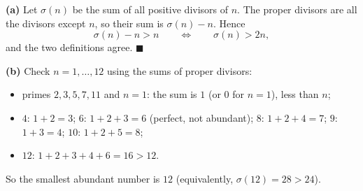 \textbf{(a)} Let $\sigma(n)$ be the sum of all positive divisors of $n$. The proper divisors are all the divisors except $n$, so their sum is $\sigma(n)-n$. Hence
\[
\sigma(n)-n>n\qquad\Longleftrightarrow\qquad \sigma(n)>2n ,
\]
and the two definitions agree. $\blacksquare$

\textbf{(b)} Check $n=1,\dots,12$ using the sums of proper divisors:
\begin{itemize}
\item primes $2,3,5,7,11$ and $n=1$: the sum is $1$ (or $0$ for $n=1$), less than $n$;
\item $4$: $1+2=3$; $6$: $1+2+3=6$ (perfect, not abundant); $8$: $1+2+4=7$; $9$: $1+3=4$; $10$: $1+2+5=8$;
\item $12$: $1+2+3+4+6=16>12$.
\end{itemize}
So the smallest abundant number is $\boxed{12}$ (equivalently, $\sigma(12)=28>24$).
